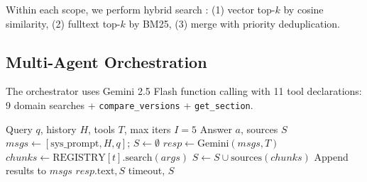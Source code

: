 \documentclass[11pt,a4paper]{article}
\newcommand{\systemname}{\textsc{MASDR-RAG}}
\begin{document}
Within each scope, we perform hybrid search \cite{chen2024blendedrag}: (1) vector top-$k$ by cosine similarity, (2) fulltext top-$k$ by BM25, (3) merge with priority deduplication.

\begin{table}[H]
\centering
{}
\caption{Search space reduction. Most agents search $<$5\% of total corpus.}
\label{tab:search_space}
\end{table}

\subsection{Multi-Agent Orchestration}
\label{sec:orchestrator}

The orchestrator uses Gemini 2.5 Flash function calling with 11 tool declarations: 9 domain searches + \texttt{compare\_versions} + \texttt{get\_section}.

\begin{algorithm}[H]
\small
\caption{\systemname{} Orchestration}
\label{alg:orchestrator}
\begin{algorithmic}[1]
\REQUIRE Query $q$, history $H$, tools $T$, max iters $I{=}5$
\ENSURE Answer $a$, sources $S$
\STATE $msgs \leftarrow [\text{sys\_prompt}, H, q]$; $S \leftarrow \emptyset$
    \STATE $resp \leftarrow \text{Gemini}(msgs, T)$
            \STATE $chunks \leftarrow \text{REGISTRY}[t].\text{search}(args)$
            \STATE $S \leftarrow S \cup \text{sources}(chunks)$
        \ENDFOR
        \STATE Append results to $msgs$
    \ELSE
        \RETURN $resp.\text{text}, S$
    \ENDIF
\ENDFOR
\RETURN timeout, $S$
\end{algorithmic}
\end{algorithm}
\end{document}
